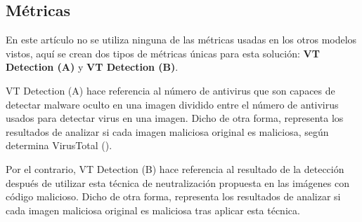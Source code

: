 \subsection{Métricas}

En este artículo no se utiliza ninguna de las métricas usadas en los otros modelos vistos, aquí se crean dos tipos de métricas únicas para esta solución: \textbf{VT Detection (A)} y \textbf{VT Detection (B)}.

VT Detection (A) hace referencia al número de antivirus que son capaces de detectar malware oculto en una imagen dividido entre el número de antivirus usados para detectar virus en una imagen. Dicho de otra forma, representa los resultados de analizar si cada imagen maliciosa original es maliciosa, según determina VirusTotal (\cite{virustotal}). %

Por el contrario, VT Detection (B) hace referencia al resultado de la detección después de utilizar esta técnica de neutralización propuesta en las imágenes con código malicioso. Dicho de otra forma, representa los resultados de analizar si cada imagen maliciosa original es maliciosa tras aplicar esta técnica.